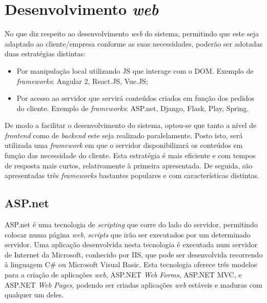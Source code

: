 

\section{Desenvolvimento \textit{web}}



No que diz respeito ao desenvolvimento \textit{web} do sistema, permitindo que este seja adaptado ao cliente/empresa conforme as suas necessidades, poderão ser adotadas duas estratégias distintas: 

\begin{itemize}
	\item Por manipulação local utilizando \ac{JS} que interage com o \ac{DOM}. Exemplo de \textit{frameworks}: Angular 2, React.JS, Vue.JS; 
	
	\item Por acesso ao servidor que servirá conteúdos criados em função dos pedidos do cliente. Exemplo de \textit{frameworks}: ASP.net, Django, Flask, Play, Spring. 
	
\end{itemize}


De modo a facilitar o desenvolvimento do sistema, optou-se que tanto  a nível de \textit{frontend} como de \textit{backend} este seja realizado paralelamente. Posto isto, será utilizada uma \textit{framework} em que o servidor disponibilizará os conteúdos em função das necessidade do cliente. Esta estratégia é mais eficiente e com tempos de resposta mais curtos, relativamente à primeira apresentada. De seguida, são apresentadas três \textit{frameworks} bastantes populares e com características distintas. 




\subsection{ASP.net}


ASP.net é uma tecnologia de \textit{scripting} que corre do lado do servidor, permitindo colocar numa página \textit{web}, \textit{scripts} que irão ser executados por um determinado servidor. Uma aplicação desenvolvida nesta tecnologia é executada num servidor de Internet da Microsoft, conhecido por \ac{IIS}, que pode ser desenvolvida recorrendo à linguagem C\# ou Microsoft Visual Basic. Esta tecnologia oferece três modelos para a criação de aplicações \textit{web}, ASP.NET \textit{Web Forms}, ASP.NET \ac{MVC}, e ASP.NET \textit{Web Pages}, podendo ser criadas aplicações \textit{web} estáveis e maduras com qualquer um deles\cite{Microsoft2016}. 


